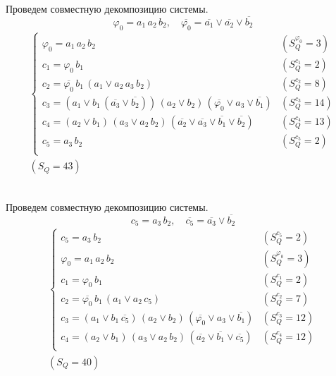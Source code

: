 \documentclass{article}
\begin{document}
\noindent\begin{minipage}{\textwidth}
Проведем совместную декомпозицию системы. \[\varphi_{0} = a_1\,a_2\,b_2, \quad \overline{\varphi_{0}} = \overline{a_1} \lor \overline{a_2} \lor \overline{b_2}\]
\[\begin{matrix}
    \begin{cases}
        \varphi_{0} = a_1\,a_2\,b_2 & (S_Q^{\varphi_{0}} = 3) \\
        c_1 = \varphi_{0}\,b_1 & (S_Q^{c_1} = 2) \\
        c_2 = \overline{\varphi_{0}}\,b_1\,\left(a_1 \lor a_2\,a_3\,b_2\right) & (S_Q^{c_2} = 8) \\
        c_3 = \left(a_1 \lor b_1\,\left(\overline{a_3} \lor \overline{b_2}\right)\right)\,\left(a_2 \lor b_2\right)\,\left(\overline{\varphi_{0}} \lor a_3 \lor \overline{b_1}\right) & (S_Q^{c_3} = 14) \\
        c_4 = \left(a_2 \lor b_1\right)\,\left(a_3 \lor a_2\,b_2\right)\,\left(\overline{a_2} \lor \overline{a_3} \lor \overline{b_1} \lor \overline{b_2}\right) & (S_Q^{c_4} = 13) \\
        c_5 = a_3\,b_2 & (S_Q^{c_5} = 2) \\
    \end{cases} \\ (S_Q = 43)
\end{matrix}\] \\ \phantom{0}
\end{minipage}
\noindent\begin{minipage}{\textwidth}
Проведем совместную декомпозицию системы. \[c_5 = a_3\,b_2, \quad \overline{c_5} = \overline{a_3} \lor \overline{b_2}\]
\[\begin{matrix}
    \begin{cases}
        c_5 = a_3\,b_2 & (S_Q^{c_5} = 2) \\
        \varphi_{0} = a_1\,a_2\,b_2 & (S_Q^{\varphi_{0}} = 3) \\
        c_1 = \varphi_{0}\,b_1 & (S_Q^{c_1} = 2) \\
        c_2 = \overline{\varphi_{0}}\,b_1\,\left(a_1 \lor a_2\,c_5\right) & (S_Q^{c_2} = 7) \\
        c_3 = \left(a_1 \lor b_1\,\overline{c_5}\right)\,\left(a_2 \lor b_2\right)\,\left(\overline{\varphi_{0}} \lor a_3 \lor \overline{b_1}\right) & (S_Q^{c_3} = 12) \\
        c_4 = \left(a_2 \lor b_1\right)\,\left(a_3 \lor a_2\,b_2\right)\,\left(\overline{a_2} \lor \overline{b_1} \lor \overline{c_5}\right) & (S_Q^{c_4} = 12) \\
    \end{cases} \\ (S_Q = 40)
\end{matrix}\] \\ \phantom{0}
\end{minipage}
\end{document}
